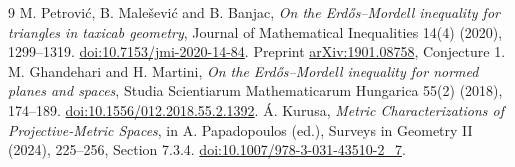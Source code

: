 \documentclass[11pt]{article}
\begin{document}
\clearpage
\begin{thebibliography}{9}
 M. Petrovi\'c, B. Male\v{s}evi\'c and B. Banjac, \emph{On the Erd\H{o}s--Mordell inequality for triangles in taxicab geometry}, Journal of Mathematical Inequalities 14(4) (2020), 1299--1319. \href{https://doi.org/10.7153/jmi-2020-14-84}{doi:10.7153/jmi-2020-14-84}. Preprint \href{https://arxiv.org/abs/1901.08758}{arXiv:1901.08758}, Conjecture 1.
 M. Ghandehari and H. Martini, \emph{On the Erd\H{o}s--Mordell inequality for normed planes and spaces}, Studia Scientiarum Mathematicarum Hungarica 55(2) (2018), 174--189. \href{https://doi.org/10.1556/012.2018.55.2.1392}{doi:10.1556/012.2018.55.2.1392}.
 \'A. Kurusa, \emph{Metric Characterizations of Projective-Metric Spaces}, in A. Papadopoulos (ed.), Surveys in Geometry II (2024), 225--256, Section 7.3.4. \href{https://doi.org/10.1007/978-3-031-43510-2_7}{doi:10.1007/978-3-031-43510-2\_7}.
\end{thebibliography}
\end{document}
